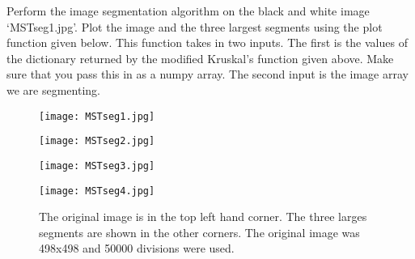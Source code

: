 

\begin{problem}
Perform the image segmentation algorithm on the black and white image `MSTseg1.jpg'. Plot the image and the three largest segments using the plot function given below. This function takes in two inputs. The first is the values of the dictionary returned by the modified Kruskal's function given above. Make sure that you pass this in as a numpy array. The second input is the image array we are segmenting. 

\end{problem}

\vfill
\begin{figure}[ht]
\begin{minipage}[b]{0.47\linewidth}
\centering
\texttt{[image: MSTseg1.jpg]}
\end{minipage}
\hspace{0.5cm}
\begin{minipage}[b]{0.47\linewidth}
\centering
\texttt{[image: MSTseg2.jpg]}
\end{minipage}
\begin{minipage}[b]{0.47\linewidth}
\centering
\texttt{[image: MSTseg3.jpg]}
\end{minipage}
\hspace{0.5cm}
\begin{minipage}[b]{0.47\linewidth}
\centering
\texttt{[image: MSTseg4.jpg]}
\end{minipage}
\caption{The original image is in the top left hand corner. The three larges segments are shown in the other corners. The original image was 498x498 and 50000 divisions were used.}
\label{fig:graph6}
\end{figure}
\vfill 
